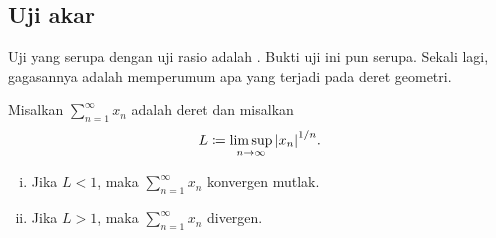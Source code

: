 

\subsection{Uji akar}

Uji yang serupa dengan uji rasio adalah
\emph{}.  Bukti uji ini pun serupa.
Sekali lagi, gagasannya adalah memperumum apa yang terjadi pada deret geometri.

\begin{prop}
Misalkan $\sum_{n=1}^\infty x_n$ adalah deret dan misalkan
\begin{equation*}
L \coloneqq \limsup_{n\to\infty} {\lvert {x_n} \rvert}^{1/n} .
\end{equation*}
\begin{enumerate}[(i)]
\item Jika $L < 1$, maka $\sum_{n=1}^\infty x_n$ konvergen mutlak.
\item Jika $L > 1$, maka $\sum_{n=1}^\infty x_n$ divergen.
\end{enumerate}
\end{prop}

